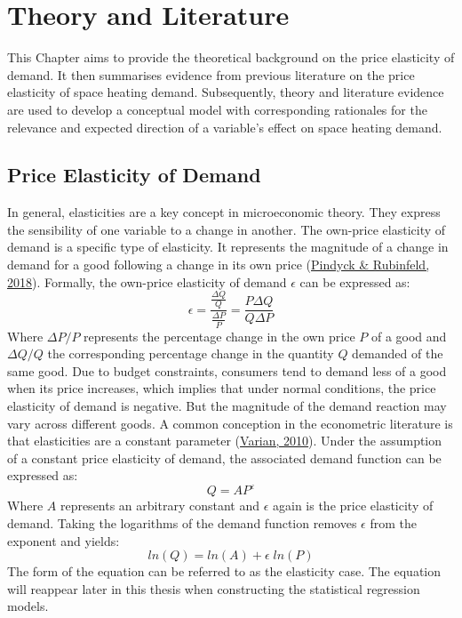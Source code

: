\documentclass[12pt,twoside]{reedthesis}
\begin{document}
\hypertarget{literature}{%
\chapter{Theory and Literature}\label{literature}}

This Chapter aims to provide the theoretical background on the price elasticity of demand. It then summarises evidence from previous literature on the price elasticity of space heating demand. Subsequently, theory and literature evidence are used to develop a conceptual model with corresponding rationales for the relevance and expected direction of a variable's effect on space heating demand.

\hypertarget{theory}{%
\section{Price Elasticity of Demand}\label{theory}}

In general, elasticities are a key concept in microeconomic theory. They express the sensibility of one variable to a change in another. The own-price elasticity of demand is a specific type of elasticity. It represents the magnitude of a change in demand for a good following a change in its own price (\protect\hyperlink{ref-pindyck_rubinfeld18}{Pindyck \& Rubinfeld, 2018}). Formally, the own-price elasticity of demand \(\epsilon\) can be expressed as:
\begin{equation}
\epsilon = \frac{\frac{\Delta Q}{Q}}{\frac{\Delta P}{P}} = \frac{P \Delta Q}{Q \Delta P}
\label{eq:ep}
\end{equation}
Where \(\Delta P/P\) represents the percentage change in the own price \(P\) of a good and \(\Delta Q/Q\) the corresponding percentage change in the quantity \(Q\) demanded of the same good. Due to budget constraints, consumers tend to demand less of a good when its price increases, which implies that under normal conditions, the price elasticity of demand is negative. But the magnitude of the demand reaction may vary across different goods. A common conception in the econometric literature is that elasticities are a constant parameter (\protect\hyperlink{ref-varian10}{Varian, 2010}). Under the assumption of a constant price elasticity of demand, the associated demand function can be expressed as:
\begin{equation}
Q = AP^{\varepsilon}
\label{eq:demand}
\end{equation}
Where \(A\) represents an arbitrary constant and \(\epsilon\) again is the price elasticity of demand. Taking the logarithms of the demand function removes \(\epsilon\) from the exponent and yields:
\begin{equation}
ln(Q) = ln(A) + \epsilon \; ln(P)
\label{eq:demand2}
\end{equation}
The form of the equation can be referred to as the elasticity case. The equation will reappear later in this thesis when constructing the statistical regression models.
\end{document}

